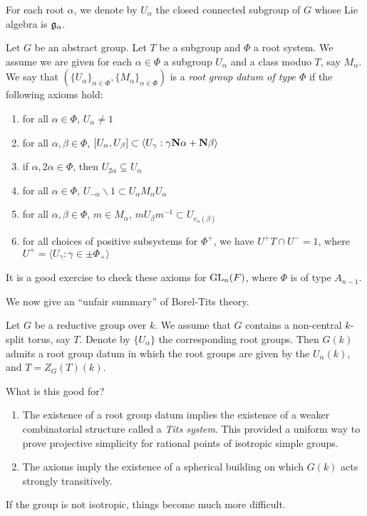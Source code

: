 \documentclass{article}
\begin{document}
For each root $\alpha$, we denote by $U_\alpha$ the closed connected subgroup of 
$G$ whose Lie algebra is $\mathfrak{g}_\alpha$. 

\begin{definition}
Let $G$ be an abstract group. Let $T$ be a subgroup and $\Phi$ a root system. We 
assume we are given for each $\alpha\in \Phi$ a subgroup $U_\alpha$ and a class 
moduo $T$, say $M_\alpha$. We say that 
$(\{U_\alpha\}_{\alpha\in \Phi},\{M_\alpha\}_{\alpha\in \Phi})$ is a 
\emph{root group datum of type $\Phi$} if the following axioms hold:
\begin{enumerate}
  \item for all $\alpha\in \Phi$, $U_\alpha\ne 1$
  \item for all $\alpha,\beta\in\Phi$, $[U_\alpha,U_\beta]\subset \langle U_\gamma:\gamma\mathbf{N}\alpha+\mathbf{N}\beta\rangle$
  \item if $\alpha,2\alpha\in \Phi$, then $U_{2\alpha}\subsetneq U_\alpha$
  \item for all $\alpha\in \Phi$, $U_{-\alpha}\smallsetminus 1 \subset U_\alpha M_\alpha U_\alpha$ 
  \item for all $\alpha,\beta\in \Phi$, $m\in M_\alpha$, $m U_\beta m^{-1} \subset U_{r_\alpha(\beta)}$
  \item for all choices of positive subsystems for $\Phi^+$, we have 
    $U^+ T \cap U^-=1$, where $U^+=\langle U_\gamma:\gamma \in \pm \Phi_+\rangle$ 
\end{enumerate}
\end{definition}

It is a good exercise to check these axioms for $\operatorname{GL}_n(F)$, where 
$\Phi$ is of type $A_{n-1}$. 

We now give an ``unfair summary'' of Borel-Tits theory. 

\begin{theorem}
Let $G$ be a reductive group over $k$. We assume that $G$ contains a non-central 
$k$-split torus, say $T$. Denote by $\{U_\alpha\}$ the corresponding root groups. 
Then $G(k)$ admits a root group datum in which the root groups are given by the 
$U_\alpha(k)$, and $T=Z_G(T)(k)$. 
\end{theorem}

What is this good for? 
\begin{enumerate}
  \item The existence of a root group datum implies the existence of a weaker 
    combinatorial structure called a \emph{Tits system}. This provided a 
    uniform way to prove projective simplicity for rational points of 
    isotropic simple groups. 
  \item The axioms imply the existence of a spherical building on which $G(k)$ 
    acts strongly transitively. 
\end{enumerate}
If the group is not isotropic, things become much more difficult. 
\end{document}
